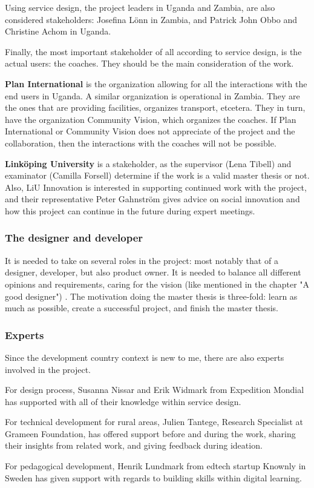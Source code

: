 Using service design, the project leaders in Uganda and Zambia, are also considered stakeholders: Josefina Lönn in Zambia, and Patrick John Obbo and Christine Achom in Uganda.

Finally, the most important stakeholder of all according to service design, is the actual users: the coaches. They should be the main consideration of the work.

\textbf{Plan International} is the organization allowing for all the interactions with the end users in Uganda. A similar organization is operational in Zambia. They are the ones that are providing facilities, organizes transport, etcetera. They in turn, have the organization Community Vision, which organizes the coaches. If Plan International or Community Vision does not appreciate of the project and the collaboration, then the interactions with the coaches will not be possible.

\textbf{Linköping University} is a stakeholder, as the supervisor (Lena Tibell) and examinator (Camilla Forsell) determine if the work is a valid master thesis or not. Also, LiU Innovation is interested in supporting continued work with the project, and their representative Peter Gahnström gives advice on social innovation and how this project can continue in the future during expert meetings.

\subsubsection{The designer and developer}
It is needed to take on several roles in the project: most notably that of a designer, developer, but also product owner. It is needed to balance all different opinions and requirements, caring for the vision (like mentioned in the chapter "A good designer") . The motivation doing the master thesis is three-fold: learn as much as possible, create a successful project, and finish the master thesis.

\subsubsection{Experts}
Since the development country context is new to me, there are also experts involved in the project.

For design process, Susanna Nissar and Erik Widmark from Expedition Mondial has supported with all of their knowledge within service design.

For technical development for rural areas, Julien Tantege, Research Specialist at Grameen Foundation, has offered support before and during the work, sharing their insights from related work, and giving feedback during ideation.

For pedagogical development, Henrik Lundmark from edtech startup Knownly in Sweden has given support with regards to building skills within digital learning.
